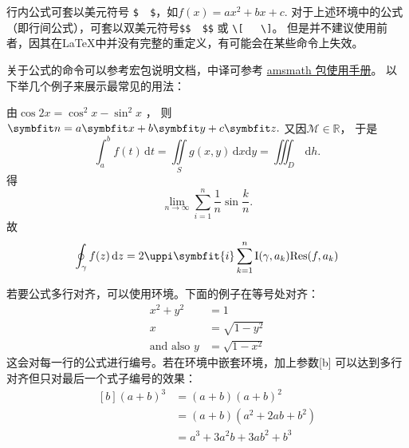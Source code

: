 行内公式可套以美元符号 \verb+$  $+，如$f(x)=ax^2+bx+c$.
对于上述环境中的公式（即行间公式），可套以双美元符号\verb+$$  $$+
或 \verb+\[   \]+。
但是并不建议使用前者，因其在\LaTeX{}中并没有完整的重定义，有可能会在某些命令上失效。

关于公式的命令可以参考宏包说明文档，中译可参考 \href{http://static.latexstudio.net/article/2019/0204/amsmath-guide-zh-cn.pdf}{amsmath 包使用手册}。%
以下举几个例子来展示最常见的用法：

由$\cos 2x=\cos^2x-\sin^2x$ ，	%
则$\Vector{n}=a\Vector{x}+b\Vector{y}+c\Vector{z}.$	%
又因$\mathcal{M}\in \mathbb{R}$，			%
于是
\[
	\int_a^b f(t)\,\mathrm{d}t = \iint\limits_S g(x,y)\,\mathrm{d}x\mathrm{d}y
	= \iiint\nolimits_D\, \mathrm{d}h.	%
\]
得
$$\lim_{n \to \infty}\sum_{i=1}^n{\frac{1}{n}}\sin\frac{k}{n}.$$	%
故
\begin{equation}\label{eq:res}
	\oint_{\gamma}f(z)\,\mathrm{d}z=2\uppi\symbfit{i}\sum^n_{k=1}\mathrm{I}(\gamma,a_k)\mathrm{Res}(f,a_k)
\end{equation}

若要公式多行对齐，可以使用环境。下面的例子在等号处对齐：
\begin{align}
	x^2 + y^2 & = 1            \\
	x         & = \sqrt{1-y^2} \\\text{and also }
	y         & =\sqrt{1-x^2}
\end{align}
这会对每一行的公式进行编号。若在环境中嵌套环境，加上参数[b]
可以达到多行对齐但只对最后一个式子编号的效果：
\begin{equation}
	\begin{aligned}[b]
		(a + b)^3   & = (a + b) (a + b)^2         \\
					& = (a + b)(a^2 + 2ab + b^2)  \\
					& = a^3 + 3a^2b + 3ab^2 + b^3
	\end{aligned}
\end{equation}

